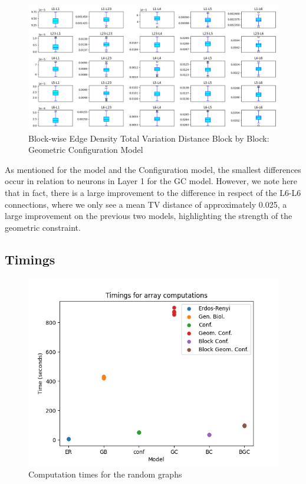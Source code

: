 \begin{figure}[H]
\begin{center}
\captionsetup{justification=centering}
\includegraphics[width=12cm]{results_imgs/gc_bed.png}
\caption{Block-wise Edge Density Total Variation Distance Block by Block: Geometric Configuration Model}
\end{center}
\end{figure}
As mentioned for the \ER model and the Configuration model, the smallest differences occur in relation to neurons in Layer 1 for the GC model. However, we note here that in fact, there is a large improvement to the difference in respect of the L6-L6 connections, where we only see a mean TV distance of approximately 0.025, a large improvement on the previous two models, highlighting the strength of the geometric constraint.


\subsection{Timings}
\begin{figure}[H]
\begin{center}
\captionsetup{justification=centering}
\includegraphics[width=12cm]{graph/timings.png}
\caption{Computation times for the random graphs}
\end{center}
\end{figure}

